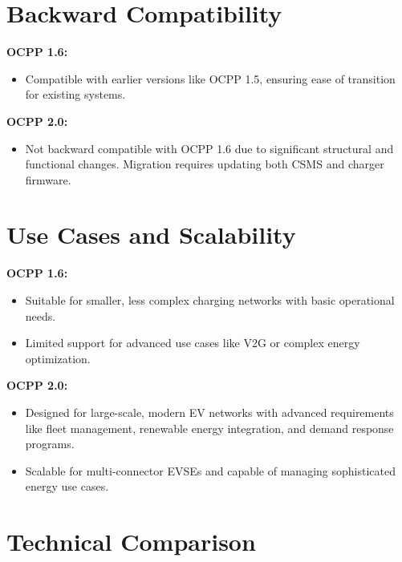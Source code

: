 \documentclass[12pt,a4paper]{report}
\begin{document}
\section{Backward Compatibility}

\textbf{OCPP 1.6:}
\begin{itemize}
  \item Compatible with earlier versions like OCPP 1.5, ensuring ease of transition for
        existing systems.
\end{itemize}

\textbf{OCPP 2.0:}
\begin{itemize}
  \item Not backward compatible with OCPP 1.6 due to significant structural and functional
        changes. Migration requires updating both CSMS and charger firmware.
\end{itemize}

\section{Use Cases and Scalability}

\textbf{OCPP 1.6:}
\begin{itemize}
  \item Suitable for smaller, less complex charging networks with basic operational needs.
  \item Limited support for advanced use cases like V2G or complex energy optimization.
\end{itemize}

\textbf{OCPP 2.0:}
\begin{itemize}
  \item Designed for large-scale, modern EV networks with advanced requirements like fleet
        management, renewable energy integration, and demand response programs.
  \item Scalable for multi-connector EVSEs and capable of managing sophisticated energy use
        cases.
\end{itemize}

\section{Technical Comparison}
\end{document}
